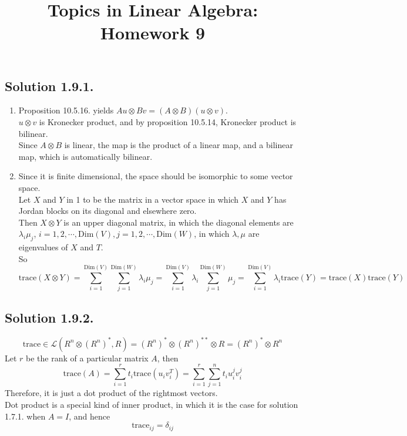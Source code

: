\documentclass{article}
\title{Topics in Linear Algebra: Homework 9}
\begin{document}
\maketitle
\subsection*{Solution 1.9.1.}
\begin{enumerate}
    \item Proposition 10.5.16. yields $Au \otimes Bv = (A \otimes B)(u \otimes v)$. \\
    $u \otimes v$ is Kronecker product, and by proposition 10.5.14, Kronecker product is bilinear. \\
    Since $A\otimes B$ is linear, the map is the product of a linear map, and a bilinear map, which is automatically bilinear.
    \item Since it is finite dimensional, the space should be isomorphic to some vector space. \\
    Let $X$ and $Y$ in 1 to be the matrix in a vector space in which $X$ and $Y$ has Jordan blocks on its diagonal and elsewhere zero.\\
    Then $X\otimes Y$ is an upper diagonal matrix, in which the diagonal elements are $\lambda_i\mu_j$, $i = 1, 2, \cdots, \mathrm{Dim}(V), j = 1,2, \cdots, \mathrm{Dim}(W)$, in which $\lambda, \mu$ are eigenvalues of $X$ and $T$. \\
    So 
    \[\mathrm{trace}(X\otimes Y) = \sum_{i=1} ^ {\mathrm{Dim}(V)} \sum_{j = 1} ^ {\mathrm{Dim}(W)}\lambda_i\mu_j = \sum_{i=1} ^ {\mathrm{Dim}(V)} \lambda_i \sum_{j = 1} ^ {\mathrm{Dim}(W)}\mu_j=\sum_{i=1} ^ {\mathrm{Dim}(V)} \lambda_i \mathrm{trace}(Y) = \mathrm{trace}(X)\mathrm{trace}(Y)\]
\end{enumerate}
\subsection*{Solution 1.9.2.}
\[\mathrm{trace}\in \mathcal{L}(R^n \otimes (R^n)^*,R) = (R^n)^* \otimes (R ^n) ^{**} \otimes R = (R^n)^* \otimes R ^n\]
Let $r$ be the rank of a particular matrix $A$, then
\[\mathrm{trace}(A) = \sum_{i = 1} ^ r t_i \mathrm{trace} (u_iv_i^T) = \sum_{i=1}^r\sum_{j = 1}^n t_i u_i^jv_i^j\]
Therefore, it is just a dot product of the rightmost vectors.\\
Dot product is a special kind of inner product, in which it is the case for solution 1.7.1. when $A=I$, and hence
\[\mathrm{trace}_{ij} = \delta_{ij}\]
\end{document}
